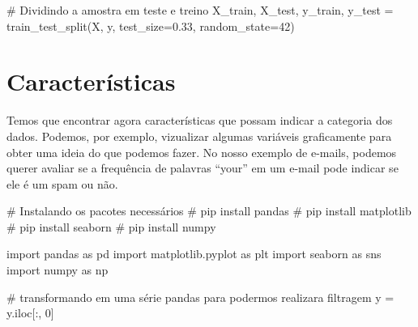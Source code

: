 \documentclass[
  letterpaper,
  DIV=11,
  numbers=noendperiod]{scrreprt}
\newenvironment{Shaded}{\begin{snugshade}}{\end{snugshade}}
\newcommand{\CommentTok}[1]{\textcolor[rgb]{0.37,0.37,0.37}{#1}}
\newcommand{\DecValTok}[1]{\textcolor[rgb]{0.68,0.00,0.00}{#1}}
\newcommand{\FloatTok}[1]{\textcolor[rgb]{0.68,0.00,0.00}{#1}}
\newcommand{\ImportTok}[1]{\textcolor[rgb]{0.00,0.46,0.62}{#1}}
\newcommand{\NormalTok}[1]{\textcolor[rgb]{0.00,0.23,0.31}{#1}}
\newcommand{\OperatorTok}[1]{\textcolor[rgb]{0.37,0.37,0.37}{#1}}
\begin{document}
\begin{Shaded}
\begin{Highlighting}[]
\CommentTok{\# Dividindo a amostra em teste e treino}
\NormalTok{X\_train, X\_test, y\_train, y\_test }\OperatorTok{=}\NormalTok{ train\_test\_split(X, y, test\_size}\OperatorTok{=}\FloatTok{0.33}\NormalTok{, random\_state}\OperatorTok{=}\DecValTok{42}\NormalTok{)}
\end{Highlighting}
\end{Shaded}


\hypertarget{caracteruxedsticas}{%
\chapter{Características}\label{caracteruxedsticas}}

Temos que encontrar agora características que possam indicar a categoria
dos dados. Podemos, por exemplo, vizualizar algumas variáveis
graficamente para obter uma ideia do que podemos fazer. No nosso exemplo
de e-mails, podemos querer avaliar se a frequência de palavras ``your''
em um e-mail pode indicar se ele é um spam ou não.

\begin{Shaded}
\begin{Highlighting}[]
\CommentTok{\# Instalando os pacotes necessários}
\CommentTok{\# pip install pandas}
\CommentTok{\# pip install matplotlib}
\CommentTok{\# pip install seaborn}
\CommentTok{\# pip install numpy}
\end{Highlighting}
\end{Shaded}

\begin{Shaded}
\begin{Highlighting}[]
\ImportTok{import}\NormalTok{ pandas }\ImportTok{as}\NormalTok{ pd}
\ImportTok{import}\NormalTok{ matplotlib.pyplot }\ImportTok{as}\NormalTok{ plt}
\ImportTok{import}\NormalTok{ seaborn }\ImportTok{as}\NormalTok{ sns}
\ImportTok{import}\NormalTok{ numpy }\ImportTok{as}\NormalTok{ np}
\end{Highlighting}
\end{Shaded}

\begin{Shaded}
\begin{Highlighting}[]
\CommentTok{\# transformando em uma série pandas para podermos realizara filtragem}
\NormalTok{y }\OperatorTok{=}\NormalTok{ y.iloc[:, }\DecValTok{0}\NormalTok{]}
\end{Highlighting}
\end{Shaded}
\end{document}
